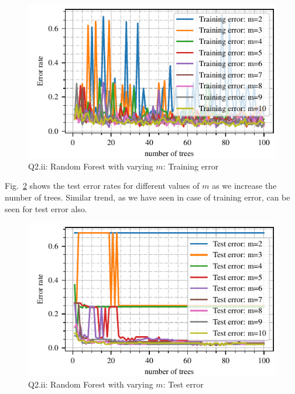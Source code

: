 \begin{figure}[!h]
	\centering
	\includegraphics[scale=1.0,trim={0cm 0cm 0cm 0cm},clip]{./code/generatedPlots/q2ii_error_rate_trn.pdf}
	\caption{Q2.ii: Random Forest with varying $m$: Training error}
	\label{fig:q2ii_error_rate_trn}
\end{figure}
Fig.~\ref{fig:q2ii_error_rate_tst} shows the test error rates for different values of $m$ as we increase the number of trees. Similar trend, as we have seen in case of training error, can be seen for test error also.
\begin{figure}[!h]
	\centering
	\includegraphics[scale=1.0,trim={0cm 0cm 0cm 0cm},clip]{./code/generatedPlots/q2ii_error_rate_tst.pdf}
	\caption{Q2.ii: Random Forest with varying $m$: Test error}
	\label{fig:q2ii_error_rate_tst}
\end{figure}
